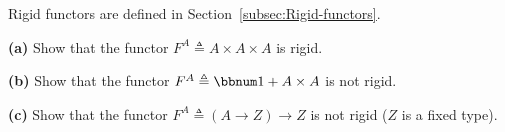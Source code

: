 Rigid functors are defined in Section~\ref{subsec:Rigid-functors}.

\textbf{(a)} Show that the functor $F^{A}\triangleq A\times A\times A$
is rigid. 

\textbf{(b)} Show that the functor $F^{A}\triangleq\bbnum 1+A\times A$
is not rigid. 

\textbf{(c)} Show that the functor $F^{A}\triangleq\left(A\rightarrow Z\right)\rightarrow Z$
is not rigid ($Z$ is a fixed type).

\begin{comment}
Chapter eleven of the functional programming tutorial computations
in a central context have been one of the teams in this tutorial and
this is a final part this which talks about moon and transformers
to begin let me look at some code that needs to compute a value in
the future but the value is of optional type so these kind of computations
often happen in application code when you are computing some value
in the future but the value itself has additional logic and option
is a simplest such example so imagine that we would like to implement
a program that computes a value using a future and then if this value
is a non-empty option the computation continues and then it can compute
another value again in the future using what was concluded before
and that computation again returns an optional type and we again see
if that is a non-empty option and if so we continue and return another
future value and so on and if at any time this option is empty after
having computed it we need to stop some way short-cut the computation
by returning a feature of none right away so that\textsf{'}s what we have to
do so the code then starts looking like this now I just write here
option of one very simple computations for which I wouldn't have to
do such coding but in real life test as a function that takes time
to compute so I put it into a future and then it might return an empty
result I don't know that in advance let\textsf{'}s suppose and then I need
to match on that result so you see this code is quite difficult to
read and difficult to modify that is to maintain and the reason is
that it\textsf{'}s full of repetitions so there are all these match expressions
that always have the same structure if there is a Sun then we continue
if there is none then we were transfusion successful now it is precisely
that kind of repetition that was eliminated by using the function
block or the for yield block but so we eliminate them but only for
the outer type constructor the inner type constructor remains and

\end{comment}
